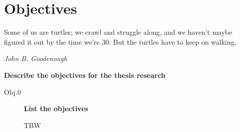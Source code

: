 
\chapter{\label{chp:objectives}Objectives}
\epigraph{Some of us are turtles; we crawl and struggle along, and we haven’t maybe figured it out by the time we’re 30. But the turtles have to keep on walking.}{\textit{John B. Goodenough}}

\textbf{Describe the objectives for the thesis research}


\begin{description}
\item[Obj.0] \textbf{List the objectives}

  TBW
  
\end{description}

